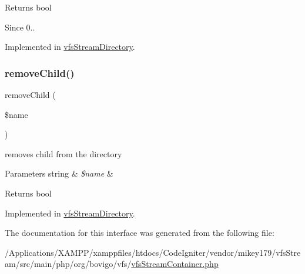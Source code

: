\begin{DoxyReturn}{Returns}
bool 
\end{DoxyReturn}
\begin{DoxySince}{Since}
0.. 
\end{DoxySince}


Implemented in \mbox{\hyperlink{classorg_1_1bovigo_1_1vfs_1_1vfs_stream_directory_a1332d27ba1ecefa899e393e83309735e}{vfs\+Stream\+Directory}}.

\mbox{\label{interfaceorg_1_1bovigo_1_1vfs_1_1vfs_stream_container_a2b20c5390cd11395e9a3d32c8c8e51b6}} 
\subsubsection{\texorpdfstring{remove\+Child()}{removeChild()}}
{\footnotesize\ttfamily remove\+Child (\begin{DoxyParamCaption}\item[{}]{\$name }\end{DoxyParamCaption})}

removes child from the directory


\begin{DoxyParams}[1]{Parameters}
string & {\em \$name} & \\
\hline
\end{DoxyParams}
\begin{DoxyReturn}{Returns}
bool 
\end{DoxyReturn}


Implemented in \mbox{\hyperlink{classorg_1_1bovigo_1_1vfs_1_1vfs_stream_directory_a2b20c5390cd11395e9a3d32c8c8e51b6}{vfs\+Stream\+Directory}}.



The documentation for this interface was generated from the following file\+:\begin{DoxyCompactItemize}
\item 
/\+Applications/\+X\+A\+M\+P\+P/xamppfiles/htdocs/\+Code\+Igniter/vendor/mikey179/vfs\+Stream/src/main/php/org/bovigo/vfs/\mbox{\hyperlink{vfs_stream_container_8php}{vfs\+Stream\+Container.\+php}}\end{DoxyCompactItemize}
